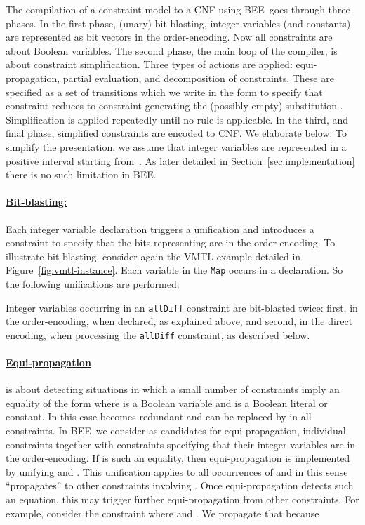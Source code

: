 \documentclass{tlp}
\newcommand{\bee}{\textsf{BEE}}
\begin{document}
The compilation of a constraint model to a CNF
using \bee\ goes through three phases. 
In the first phase, (unary) bit blasting, integer variables (and
constants) are represented as bit vectors in the order-encoding. Now
all constraints are about Boolean variables.
The second phase, the main loop of the compiler, is about constraint
simplification.  Three types of actions are applied: equi-propagation,
partial evaluation, and decomposition of constraints. These are
specified as a set of transitions which we write in the form
 to specify that constraint 
reduces to constraint  generating the (possibly empty)
substitution . Simplification is applied repeatedly until no
rule is applicable.
In the third, and final phase, simplified constraints are encoded to
CNF. We elaborate below.
To simplify the presentation, we assume that integer variables are
represented in a positive interval starting from~. As later
detailed in Section~\ref{sec:implementation} there is no such
limitation in \bee.



\vspace{-3mm}
\paragraph{\underline{Bit-blasting:}} 

Each integer variable declaration
 triggers a unification
 and introduces a
constraint  to specify that the bits representing
 are in the order-encoding.  
To illustrate bit-blasting, consider again the VMTL
example detailed in Figure~\ref{fig:vmtl-instance}. Each variable in
the \texttt{Map} occurs in a  declaration. So the
following unifications are performed:

Integer variables occurring in an \texttt{allDiff} constraint are
bit-blasted twice: first, in the order-encoding, when declared, as
explained above, and second, in the direct encoding, when processing
the \texttt{allDiff} constraint, as described below.



\vspace{-3mm}
\paragraph{\underline{Equi-propagation}} is about detecting
situations in which a small number of constraints imply an equality of
the form  where  is a Boolean variable and  is a Boolean
literal or constant. In this case  becomes redundant
and can be replaced by  in all constraints.
In \bee\ we consider as candidates for equi-propagation, individual
constraints together with constraints specifying that their integer
variables are in the order-encoding. If  is such an equality,
then equi-propagation is implemented by unifying  and . This
unification applies to all occurrences of  and in this sense
``propagates'' to other constraints involving . Once
equi-propagation detects such an equation, this may trigger further
equi-propagation from other constraints.
For example, consider the constraint 
where  and
. We propagate that  because
\end{document}
